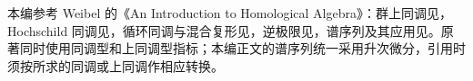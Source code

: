 \ProseParagraphBreak
本编参考 Weibel 的《An Introduction to Homological Algebra》：群上同调见\cite[Sections 6.1--6.8, Section 6.11]{Weibel1994HomologicalAlgebra}，Hochschild 同调见\cite[Sections 9.1--9.5]{Weibel1994HomologicalAlgebra}，循环同调与混合复形见\cite[Sections 9.6, 9.8]{Weibel1994HomologicalAlgebra}，逆极限见\cite[Section 3.5]{Weibel1994HomologicalAlgebra}，谱序列及其应用见\cite[Sections 5.2--5.9]{Weibel1994HomologicalAlgebra}。原著同时使用同调型和上同调型指标；本编正文的谱序列统一采用升次微分，引用时须按所求的同调或上同调作相应转换。







